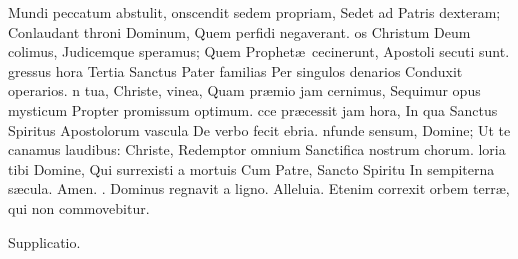 \documentclass[letter,11pt]{book}
\makeatletter
\DeclareRobustCommand{\Vbar}{\vers@resp{-0.1em}{V}}
\newcommand{\vers@resp@sym}{\raisebox{0.2ex}{\rotatebox[origin=c]{-20}{$\m@th\rceil$}}}
\newcommand{\vers@resp}[2]{%
  {\ooalign{\hidewidth\kern#1\vers@resp@sym\hidewidth\cr#2\cr}}%
}%
\def\V{\color{Red} \Vbar . \color{black}}
\makeatother
\begin{document}
\begin{multicols*}{2}
\newline \indent Mundi peccatum abstulit,
onscendit sedem propriam,
\newline \indent Sedet ad Patris dexteram;
\newline \indent Conlaudant throni Dominum,
\newline \indent Quem perfidi negaverant.
os Christum Deum colimus,
\newline \indent Judicemque speramus;
\newline \indent Quem Prophet\ae \ cecinerunt,
\newline \indent Apostoli secuti sunt.
gressus hora Tertia
\newline \indent Sanctus Pater familias
\newline \indent Per singulos denarios
\newline \indent Conduxit operarios.
n tua, Christe, vinea,
\newline \indent Quam pr\ae mio jam cernimus,
\newline \indent Sequimur opus mysticum
\newline \indent Propter promissum optimum.
cce pr\ae cessit jam hora,
\newline \indent In qua Sanctus Spiritus
\newline \indent Apostolorum vascula
\newline \indent De verbo fecit ebria.
nfunde sensum, Domine;
\newline \indent Ut te canamus laudibus:
\newline \indent Christe, Redemptor omnium
\newline \indent Sanctifica nostrum chorum.
loria tibi Domine,
\newline \indent Qui surrexisti a mortuis
\newline \indent Cum Patre, Sancto Spiritu
\newline \indent In sempiterna s\ae cula. Amen.
\newline \V Dominus regnavit a ligno. Alleluia. Etenim correxit orbem terr\ae , qui non commovebitur.
\vspace{-.5em} \begin{center} \color{Red} Supplicatio. \end{center} \vspace{-.5em}

\end{multicols*}
\end{document}
